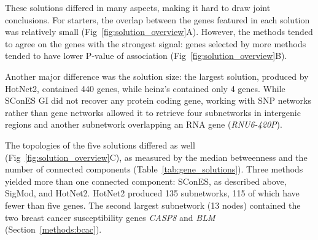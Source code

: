 \documentclass[10pt,letterpaper]{article}
\begin{document}
These solutions differed in many aspects, making it hard to draw joint conclusions. For starters, the overlap between the genes featured in each solution was relatively small (Fig~\ref{fig:solution_overview}A). However, the methods tended to agree on the genes with the strongest signal: genes selected by more methods tended to have lower P-value of association (Fig~\ref{fig:solution_overview}B).

Another major difference was the solution size: the largest solution, produced by HotNet2, contained 440 genes, while heinz's contained only 4 genes. While SConES GI did not recover any protein coding gene, working with SNP networks rather than gene networks allowed it to retrieve four subnetworks in intergenic regions and another subnetwork overlapping an RNA gene (\emph{RNU6-420P}).

The topologies of the five solutions differed as well (Fig~\ref{fig:solution_overview}C), as measured by the median betweenness and the number of connected components (Table~\ref{tab:gene_solutions}). Three methods yielded more than one connected component: SConES, as described above, SigMod, and HotNet2. HotNet2 produced 135 subnetworks, 115 of which have fewer than five genes. The second largest subnetwork (13 nodes) contained the two breast cancer susceptibility genes \emph{CASP8} and \emph{BLM} (Section~\ref{methods:bcac}).
\end{document}
